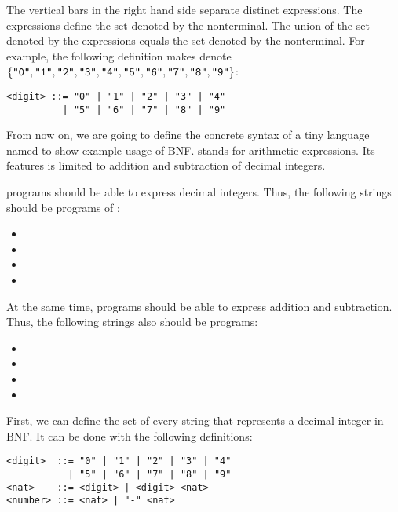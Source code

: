 The vertical bars in the right hand side separate distinct expressions.
The expressions define the set denoted by the nonterminal. The union of the set
denoted by the expressions equals the set denoted by the nonterminal. For
example, the following definition makes  denote
$\{\texttt{"0"},\texttt{"1"},\texttt{"2"},\texttt{"3"},\texttt{"4"},\texttt{"5"},\texttt{"6"},\texttt{"7"},\texttt{"8"},\texttt{"9"}\}$:

\begin{verbatim}
<digit> ::= "0" | "1" | "2" | "3" | "4"
          | "5" | "6" | "7" | "8" | "9"
\end{verbatim}

From now on, we are going to define the concrete syntax of a tiny language named
\lang to show example usage of BNF. \lang stands for arithmetic expressions. Its
features is limited to addition and subtraction of decimal integers.

\lang programs should be able to express decimal integers. Thus, the
following strings should be programs of \lang:

\begin{itemize}
  \item {}
  \item {}
  \item {}
  \item {}
\end{itemize}

At the same time, programs should be able to express addition and subtraction.
Thus, the following strings also should be programs:

\begin{itemize}
  \item {}
  \item {}
  \item {}
  \item {}
\end{itemize}

First, we can define the set of every string that represents a decimal integer
in BNF. It can be done with the following definitions:

\begin{verbatim}
<digit>  ::= "0" | "1" | "2" | "3" | "4"
           | "5" | "6" | "7" | "8" | "9"
<nat>    ::= <digit> | <digit> <nat>
<number> ::= <nat> | "-" <nat>
\end{verbatim}

